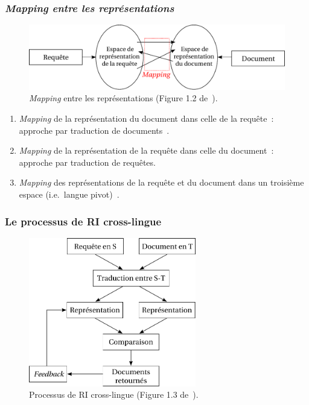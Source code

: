 \documentclass[12pt,aspectratio=43,dvipsnames,table]{beamer}
\begin{document}
\begin{frame}
    \frametitle{\textit{Mapping entre les représentations}}
    \begin{figure}
    \centering
    \includegraphics[width=1\textwidth]{img/mapping.pdf}
    \caption{\textit{Mapping} entre les représentations 
            (Figure 1.2 de~\cite{DBLP:series/synthesis/2010Nie}).}
    \end{figure}
    \vspace*{-1em}
    \begin{enumerate} 
        \item \textit{Mapping} de la représentation du document dans celle de la
              requête~: approche par traduction de documents~\cite{oard1997}.
        \item \textit{Mapping} de la représentation de la requête dans celle du 
              document~: approche par traduction de requêtes.
        \item \textit{Mapping} des représentations de la requête et du document
              dans un troisième espace 
              (i.e.~langue pivot)~\cite{ruiz1999,Kishida:2005}.
    \end{enumerate}
\end{frame}


\begin{frame}
    \frametitle{Le processus de RI cross-lingue}
    \begin{figure}
    \centering
    \includegraphics[width=0.65\textwidth]{img/typicalCLIR.pdf}
    \caption{Processus de RI cross-lingue (Figure 1.3 
             de~\cite{DBLP:series/synthesis/2010Nie}).}
    \end{figure}
\end{frame}
\end{document}
